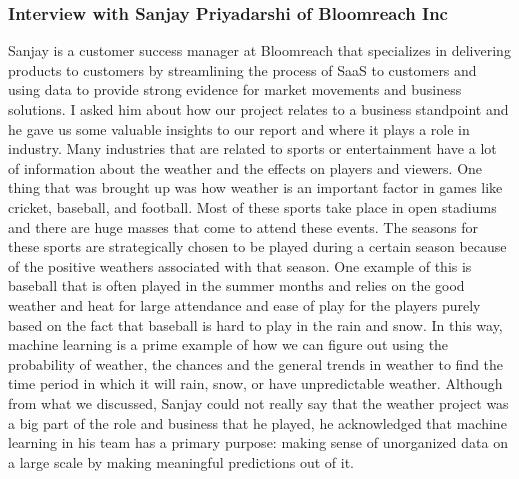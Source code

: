 \documentclass[10pt]{article}
\begin{document}
\subsubsection*{Interview with Sanjay Priyadarshi of Bloomreach Inc}
Sanjay is a customer success manager at Bloomreach that specializes in delivering products to customers by streamlining the process of SaaS to customers and using data to provide strong evidence for market movements and business solutions. I asked him about how our project relates to a business standpoint and he gave us some valuable insights to our report and where it plays a role in industry. Many industries that are related to sports or entertainment have a lot of information about the weather and the effects on players and viewers. One thing that was brought up was how weather is an important factor in games like cricket, baseball, and football. Most of these sports take place in open stadiums and there are huge masses that come to attend these events. The seasons for these sports are strategically chosen to be played during a certain season because of the positive weathers associated with that season. One example of this is baseball that is often played in the summer months and relies on the good weather and heat for large attendance and ease of play for the players purely based on the fact that baseball is hard to play in the rain and snow. In this way, machine learning is a prime example of how we can figure out using the probability of weather, the chances and the general trends in weather to find the time period in which it will rain, snow, or have unpredictable weather. Although from what we discussed, Sanjay could not really say that the weather project was a big part of the role and business that he played, he acknowledged that machine learning in his team has a primary purpose: making sense of unorganized data on a large scale by making meaningful predictions out of it.
\end{document}
